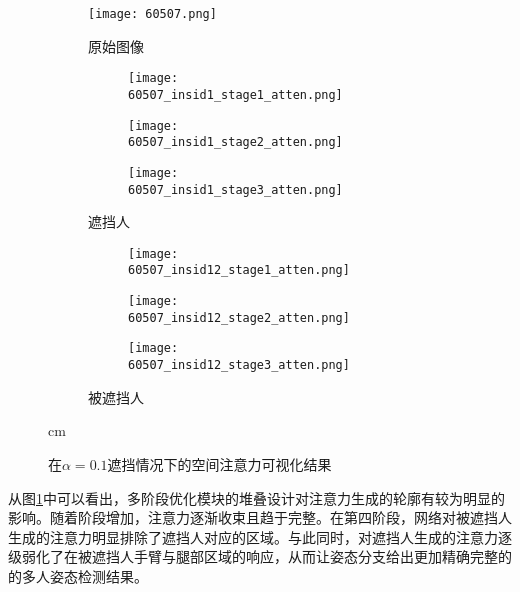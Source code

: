 \begin{figure}[H]
	\centering
	\begin{subfigure}{0.2\linewidth}
		\texttt{[image: 60507.png]}
		\caption{原始图像}
	\end{subfigure}
	\begin{subfigure}{0.2\textwidth}
		\centering
		\begin{subfigure}{\linewidth}
			\texttt{[image: 60507\_insid1\_stage1\_atten.png]}
		\end{subfigure}
		\vskip2pt
		\begin{subfigure}{\linewidth}
			\texttt{[image: 60507\_insid1\_stage2\_atten.png]}
		\end{subfigure}
		\vskip2pt
		\begin{subfigure}{\linewidth}
			\texttt{[image: 60507\_insid1\_stage3\_atten.png]}
		\end{subfigure}
		\caption{遮挡人}
	\end{subfigure}
	\begin{subfigure}{0.2\textwidth}
		\centering
		\begin{subfigure}{\linewidth}
			\texttt{[image: 60507\_insid12\_stage1\_atten.png]}
		\end{subfigure}
		\vskip2pt
		\begin{subfigure}{\linewidth}
			\texttt{[image: 60507\_insid12\_stage2\_atten.png]}
		\end{subfigure}
		\vskip2pt
		\begin{subfigure}{\linewidth}
			\texttt{[image: 60507\_insid12\_stage3\_atten.png]}
		\end{subfigure}
		\caption{被遮挡人}
	\end{subfigure}
	\begin{minipage}{0.03\linewidth}
		
			cm
		
		\vskip1.5cm
	\end{minipage}
	\caption{在$\alpha=0.1$遮挡情况下的空间注意力可视化结果}
	\label{fig:attenvis}
\end{figure}

从图\ref{fig:attenvis}中可以看出，多阶段优化模块的堆叠设计对注意力生成的轮廓有较为明显的影响。随着阶段增加，注意力逐渐收束且趋于完整。在第四阶段，网络对被遮挡人生成的注意力明显排除了遮挡人对应的区域。与此同时，对遮挡人生成的注意力逐级弱化了在被遮挡人手臂与腿部区域的响应，从而让姿态分支给出更加精确完整的的多人姿态检测结果。

